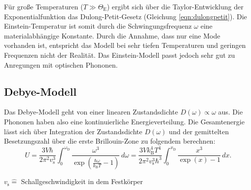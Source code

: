 Für große Temperaturen ($T \gg \Theta_{\text{E}}$) ergibt sich über die Taylor-Entwicklung der Exponentialfunktion das Dulong-Petit-Gesetz (Gleichung \eqref{eqn:dulongpetit}).
Die Einstein-Temperatur ist somit durch die Schwingungsfrequenz $\omega$ eine materialabhängige Konstante.
Durch die Annahme, dass nur eine Mode vorhanden ist, entspricht das Modell bei sehr tiefen Temperaturen und geringen Frequenzen nicht der Realität.
Das Einstein-Modell passt jedoch sehr gut zu Anregungen mit optischen Phononen.

\subsection{Debye-Modell}
Das Debye-Modell geht von einer linearen Zustandsdichte $D(\omega) \propto \omega$ aus.
Die Phononen haben also eine kontinuierliche Energieverteilung.
Die Gesamtenergie lässt sich über Integration der Zustandsdichte $D(\omega)$ und der gemittelten Besetzungszahl über die erste Brillouin-Zone zu folgendem berechnen:
\begin{equation}
	U = \frac{3 V \hbar}{2 \pi^2 v_{\text{s}}^3} \int_{0}^{\omega_{\text{D}}} \! \frac{ \omega^3 }{ \exp{ \left(  \frac{\hbar \omega}{k_{\text{B}} T} - 1  \right)} } \, d\omega
	= \frac{3 V k_{\text{B}}^4 T^4}{2 \pi^2 v_{\text{s}}^3 \hbar^3} \int_{0}^{x_{\text{D}}} \frac{x^3}{\exp{(x)}-1} \,dx.
	\label{eqn:udebye}
\end{equation}
\begin{center}
	\tiny{$ v_{\text{s}} \widehat{=}$ Schallgeschwindigkeit in dem Festkörper}
\end{center}

